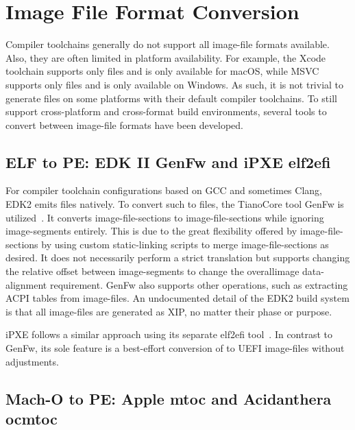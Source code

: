 \section{Image File Format Conversion}
\label{sec:img_conv}

Compiler toolchains generally do not support all \gls{image-file} formats available. Also, they are often limited in platform availability. For example, the  Xcode toolchain supports only  files and is only available for  macOS, while \gls{MSVC} supports only  files and is only available on Windows. As such, it is not trivial to generate  files on some platforms with their default compiler toolchains. To still support cross-platform and cross-format build environments, several tools to convert between \gls{image-file} formats have been developed.

\subsection{ELF to PE: EDK II GenFw and iPXE elf2efi}
\label{sec:genfw}

For compiler toolchain configurations based on \gls{GCC} and sometimes Clang, \gls{EDK2} emits  files natively. To convert such to  files, the TianoCore tool GenFw is utilized~\cite{edk2}. It converts  \glspl{image-file-section} to  \glspl{image-file-section} while ignoring  \glspl{image-segment} entirely. This is due to the great flexibility offered by  \glspl{image-file-section} by using custom \gls{static-linking} scripts to merge  \glspl{image-file-section} as desired. It does not necessarily perform a strict translation but supports changing the relative offset between \glspl{image-segment} to change the overall\gls{image} \gls{data-alignment} requirement. GenFw also supports other operations, such as extracting \gls{ACPI} tables from \glspl{image-file}. An undocumented detail of the \gls{EDK2} build system is that all \glspl{image-file} are generated as \gls{XIP}, no matter their phase or purpose.

iPXE follows a similar approach using its separate elf2efi tool~\cite{ipxe}. In contrast to GenFw, its sole feature is a best-effort conversion of  to \gls{UEFI}  \glspl{image-file} without adjustments.

\subsection{Mach-O to PE: Apple mtoc and Acidanthera ocmtoc}

